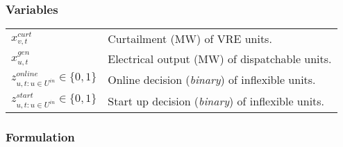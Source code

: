 \documentclass{article}
\begin{document}
\subsubsection*{Variables}

\begin{table}[h]
    \label{tab:mip_variables}
    \centering
    \begin{tabular}{ l p{10cm} }
        $x_{v,t}^{curt}$              & Curtailment (MW) of VRE units. \\
        $x_{u,t}^{gen}$              & Electrical output (MW) of dispatchable units. \\
        $z_{u,t:u \in U^{in}}^{online} \in \{0,1\}$              & Online decision (\textit{binary}) of inflexible units. \\
        $z_{u,t:u \in U^{in}}^{start} \in \{0,1\}$              & Start up decision (\textit{binary}) of inflexible units. \\
    \end{tabular}
\end{table}

\subsubsection*{Formulation}
\end{document}
